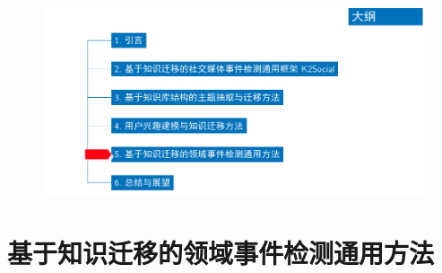 \begin{withoutheadline}
\begin{frame}
\vspace*{-13mm}
\begin{figure}
	\hspace*{-4.2mm}
    \includegraphics[width=1.0\paperwidth]{img/contents5_output.pdf}
\end{figure}

\end{frame}
\end{withoutheadline}

\section{基于知识迁移的领域事件检测通用方法}

